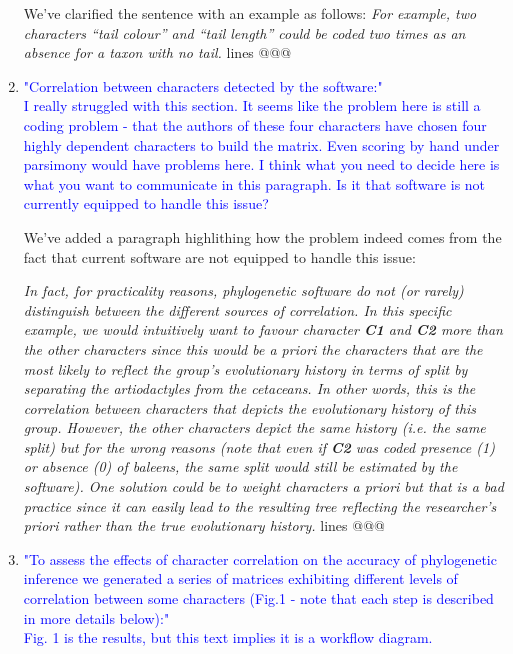 \documentclass[12pt,letterpaper]{article}
\begin{document}
\begin{enumerate}

We've clarified the sentence with an example as follows:
\textit{For example, two characters ``tail colour'' and ``tail length'' could be coded two times as an absence for a taxon with no tail.} lines @@@

\item{\textcolor{blue}{"Correlation between characters detected by the software:"\\
I really struggled with this section. It seems like the problem here is still a coding problem - that the authors of these four characters have chosen four highly dependent characters to build the matrix. Even scoring by hand under parsimony would have problems here. I think what you need to decide here is what you want to communicate in this paragraph. Is it that software is not currently equipped to handle this issue?}}

We've added a paragraph highlithing how the problem indeed comes from the fact that current software are not equipped to handle this issue:

\textit{In fact, for practicality reasons, phylogenetic software do not (or rarely) distinguish between the different sources of correlation.
In this specific example, we would intuitively want to favour character \textbf{C1} and \textbf{C2} more than the other characters since this would be \textit{a priori} the characters that are the most likely to reflect the group's evolutionary history in terms of split by separating the artiodactyles from the cetaceans.
In other words, this is the correlation between characters that depicts the evolutionary history of this group.
However, the other characters depict the same history (i.e. the same split) but for the wrong reasons (note that even if \textbf{C2} was coded presence (1) or absence (0) of baleens, the same split would still be estimated by the software).
One solution could be to weight characters \textit{a priori} but that is a bad practice since it can easily lead to the resulting tree reflecting the researcher's \textit{priori} rather than the true evolutionary history.} lines @@@

\item{\textcolor{blue}{"To assess the effects of character correlation on the accuracy of phylogenetic inference we generated a series of matrices exhibiting different levels of correlation between some characters (Fig.1 - note that each step is described in more details below):"\\
Fig. 1 is the results, but this text implies it is a workflow diagram.}}


\end{enumerate}
\end{document}
